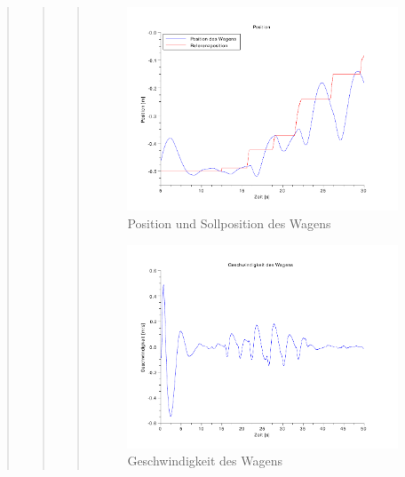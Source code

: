 \begin{quote}
\begin{quote}
\begin{quote}
            \begin{figure}[H]
                \centering
                \includegraphics[scale=0.7, trim = 0cm 0cm 0cm 0cm, clip]{Bilder/pos_pos_ref}
                \caption{Position und Sollposition des Wagens}
                \label{fig:pos_pos_ref}
            \end{figure}
            
            
            \begin{figure}[H]
                \centering
                \includegraphics[scale=0.7, trim = 0cm 0cm 0cm 0cm, clip]{Bilder/pos_gesch}
                \caption{Geschwindigkeit des Wagens}
                \label{fig:pos_gesch}
            \end{figure}
            

\end{quote}
\end{quote}
\end{quote}
